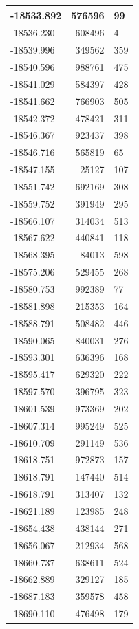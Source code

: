 \documentclass[]{book}
\theoremstyle{definition}
\theoremstyle{definition}
\theoremstyle{definition}
\theoremstyle{remark}
\begin{document}
\begin{tabular}{l|r|l}
\hline
-18533.892 & 576596 & 99\\
\hline
-18536.230 & 608496 & 4\\
\hline
-18539.996 & 349562 & 359\\
\hline
-18540.596 & 988761 & 475\\
\hline
-18541.029 & 584397 & 428\\
\hline
-18541.662 & 766903 & 505\\
\hline
-18542.372 & 478421 & 311\\
\hline
-18546.367 & 923437 & 398\\
\hline
-18546.716 & 565819 & 65\\
\hline
-18547.155 & 25127 & 107\\
\hline
-18551.742 & 692169 & 308\\
\hline
-18559.752 & 391949 & 295\\
\hline
-18566.107 & 314034 & 513\\
\hline
-18567.622 & 440841 & 118\\
\hline
-18568.395 & 84013 & 598\\
\hline
-18575.206 & 529455 & 268\\
\hline
-18580.753 & 992389 & 77\\
\hline
-18581.898 & 215353 & 164\\
\hline
-18588.791 & 508482 & 446\\
\hline
-18590.065 & 840031 & 276\\
\hline
-18593.301 & 636396 & 168\\
\hline
-18595.417 & 629320 & 222\\
\hline
-18597.570 & 396795 & 323\\
\hline
-18601.539 & 973369 & 202\\
\hline
-18607.314 & 995249 & 525\\
\hline
-18610.709 & 291149 & 536\\
\hline
-18618.751 & 972873 & 157\\
\hline
-18618.791 & 147440 & 514\\
\hline
-18618.791 & 313407 & 132\\
\hline
-18621.189 & 123985 & 248\\
\hline
-18654.438 & 438144 & 271\\
\hline
-18656.067 & 212934 & 568\\
\hline
-18660.737 & 638611 & 524\\
\hline
-18662.889 & 329127 & 185\\
\hline
-18687.183 & 359578 & 458\\
\hline
-18690.110 & 476498 & 179\\
\hline
\end{tabular}
\end{document}
